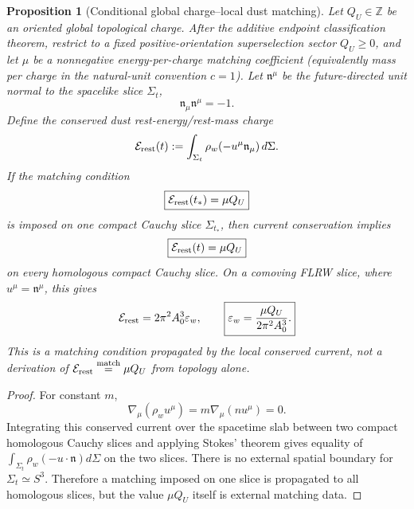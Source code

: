 \documentclass[11pt,a4paper]{article}
\def\dd{d}%
\def\QU{Q_U}%
\numberwithin{equation}{section}
\theoremstyle{definition}
\theoremstyle{plain}
\newtheorem{proposition}[criterion]{Proposition}
\theoremstyle{remark}
\newcommand{\dd}{\mathrm{d}}
\newcommand{\QU}{Q_U}
\begin{document}
\begin{proposition}[Conditional global charge--local dust matching]
Let \(\QU\in\mathbb Z\) be an oriented global topological charge. After the additive endpoint classification theorem, restrict to a fixed positive-orientation superselection sector \(\QU\ge0\), and let \(\mu\) be a nonnegative energy-per-charge matching coefficient (equivalently mass per charge in the natural-unit convention \(c=1\)). Let \(\mathfrak n^\mu\) be the future-directed unit normal to the spacelike slice \(\Sigma_t\),
\begin{equation}
\mathfrak n_\mu\mathfrak n^\mu=-1.
\end{equation}
Define the conserved dust rest-energy/rest-mass charge
\begin{equation}
\mathcal E_{\rm rest}(t)
:=\int_{\Sigma_t}\rho_w(-u^\mu\mathfrak n_\mu)\,\dd\Sigma .
\end{equation}
If the matching condition
\begin{equation}
\boxed{\mathcal E_{\rm rest}(t_*)=\mu\QU}
\end{equation}
is imposed on one compact Cauchy slice \(\Sigma_{t_*}\), then current conservation implies
\begin{equation}
\boxed{\mathcal E_{\rm rest}(t)=\mu\QU}
\end{equation}
on every homologous compact Cauchy slice. On a comoving FLRW slice, where \(u^\mu=\mathfrak n^\mu\), this gives
\begin{equation}
\mathcal E_{\rm rest}=2\pi^2A_0^3\varepsilon_w,
\qquad
\boxed{\varepsilon_w=\frac{\mu\QU}{2\pi^2A_0^3}.}
\end{equation}
This is a matching condition propagated by the local conserved current, not a derivation of \(\mathcal E_{\rm rest}\overset{\rm match}{=}\mu\QU\) from topology alone.
\end{proposition}
\begin{proof}
For constant \(m\),
\begin{equation}
\nabla_\mu(\rho_wu^\mu)=m\nabla_\mu(nu^\mu)=0.
\end{equation}
Integrating this conserved current over the spacetime slab between two compact homologous Cauchy slices and applying Stokes' theorem gives equality of \(\int_{\Sigma_t}\rho_w(-u\cdot\mathfrak n)\dd\Sigma\) on the two slices. There is no external spatial boundary for \(\Sigma_t\simeq S^3\). Therefore a matching imposed on one slice is propagated to all homologous slices, but the value \(\mu\QU\) itself is external matching data.
\end{proof}
\end{document}
